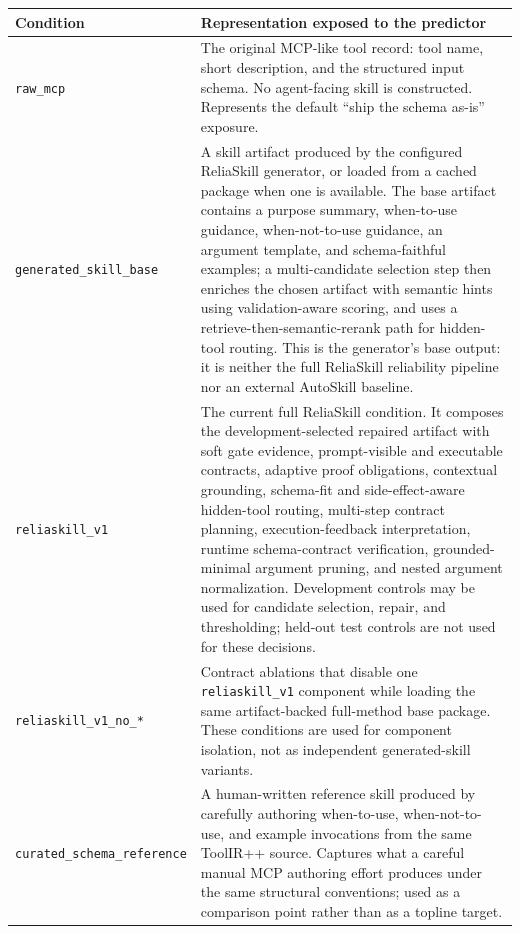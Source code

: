 \documentclass[11pt]{article}
\newcommand{\method}{ReliaSkill}
\begin{document}
\begin{table}[t]
\centering
\footnotesize
\setlength{\tabcolsep}{3pt}
\renewcommand{\arraystretch}{1.15}
\begin{tabularx}{\columnwidth}{@{}p{}X@{}}
\toprule
\textbf{Condition} & \textbf{Representation exposed to the predictor} \\
\midrule
\texttt{raw\_mcp}
  & The original MCP-like tool record: tool name, short description, and the structured input schema. No agent-facing skill is constructed. Represents the default ``ship the schema as-is'' exposure. \\
\addlinespace[2pt]
\texttt{generated\_skill\_base}
  & A skill artifact produced by the configured \method{} generator, or loaded from a cached package when one is available. The base artifact contains a purpose summary, when-to-use guidance, when-not-to-use guidance, an argument template, and schema-faithful examples; a multi-candidate selection step then enriches the chosen artifact with semantic hints using validation-aware scoring, and uses a retrieve-then-semantic-rerank path for hidden-tool routing. This is the generator's base output: it is neither the full \method{} reliability pipeline nor an external AutoSkill baseline. \\
\addlinespace[2pt]
\texttt{reliaskill\_v1}
  & The current full \method{} condition. It composes the development-selected repaired artifact with soft gate evidence, prompt-visible and executable contracts, adaptive proof obligations, contextual grounding, schema-fit and side-effect-aware hidden-tool routing, multi-step contract planning, execution-feedback interpretation, runtime schema-contract verification, grounded-minimal argument pruning, and nested argument normalization. Development controls may be used for candidate selection, repair, and thresholding; held-out test controls are not used for these decisions. \\
\addlinespace[2pt]
\texttt{reliaskill\_v1\_no\_*}
  & Contract ablations that disable one \texttt{reliaskill\_v1} component while loading the same artifact-backed full-method base package. These conditions are used for component isolation, not as independent generated-skill variants. \\
\addlinespace[2pt]
\texttt{curated\_schema\_reference}
  & A human-written reference skill produced by carefully authoring when-to-use, when-not-to-use, and example invocations from the same ToolIR++ source. Captures what a careful manual MCP authoring effort produces under the same structural conventions; used as a comparison point rather than as a topline target. \\

\end{tabularx}
\end{table}
\end{document}
